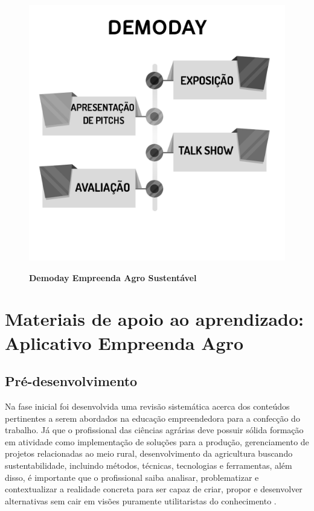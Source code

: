 \begin{figure}[H]
\centering
\caption{\textbf{Demoday Empreenda Agro Sustentável}}
\includegraphics[scale=0.4]{Imagens/workshop-04.png}
\label{figura_33}
\end{figure}


\section{Materiais de apoio ao aprendizado: Aplicativo Empreenda Agro}

\subsection{Pré-desenvolvimento}

Na fase inicial foi desenvolvida uma revisão sistemática acerca dos conteúdos pertinentes a serem abordados na educação empreendedora para a confecção do trabalho. Já que o profissional das ciências agrárias deve possuir sólida formação em atividade como implementação de soluções para a produção, gerenciamento de projetos relacionadas ao meio rural, desenvolvimento da agricultura buscando sustentabilidade, incluindo métodos, técnicas, tecnologias e ferramentas, além disso, é importante que o profissional saiba analisar, problematizar e contextualizar a realidade concreta para ser capaz de criar, propor e desenvolver alternativas sem cair em visões puramente utilitaristas do conhecimento \cite{cavalcanti_da_2019}.

